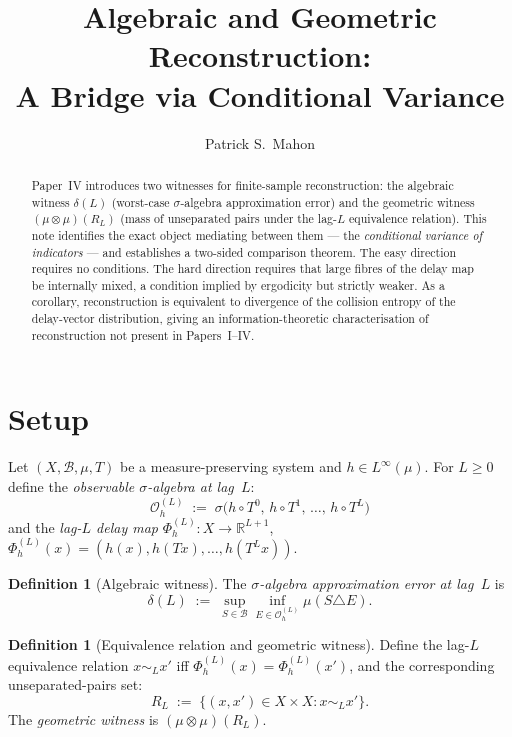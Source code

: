 \documentclass[11pt]{article}
\title{Algebraic and Geometric Reconstruction:\\
\large A Bridge via Conditional Variance}
\author{Patrick S.\ Mahon}
\date{}
\theoremstyle{definition}
\newtheorem{definition}[theorem]{Definition}
\newcommand{\Bcal}{\mathcal{B}}
\newcommand{\OL}{\mathcal{O}_h^{(L)}}
\newcommand{\PhiL}{\Phi_h^{(L)}}
\newcommand{\Lp}[1]{L^{#1}}
\newcommand{\RL}{R_L}
\newcommand{\dL}{\delta(L)}
\begin{document}
\maketitle

\begin{abstract}
Paper~IV introduces two witnesses for finite-sample reconstruction: the
algebraic witness $\delta(L)$ (worst-case $\sigma$-algebra approximation error)
and the geometric witness $(\mu \otimes \mu)(R_L)$ (mass of unseparated pairs
under the lag-$L$ equivalence relation).
This note identifies the exact object mediating between them --- the
\emph{conditional variance of indicators} --- and establishes a two-sided
comparison theorem.
The easy direction requires no conditions.
The hard direction requires that large fibres of the delay map be internally
mixed, a condition implied by ergodicity but strictly weaker.
As a corollary, reconstruction is equivalent to divergence of the collision
entropy of the delay-vector distribution, giving an information-theoretic
characterisation of reconstruction not present in Papers~I--IV.
\end{abstract}

\section{Setup}

Let $(X, \Bcal, \mu, T)$ be a measure-preserving system and $h \in \Lp{\infty}(\mu)$.
For $L \geq 0$ define the \emph{observable $\sigma$-algebra at lag~$L$}:
\[
  \OL \;:=\; \sigma\bigl(h \circ T^0,\, h \circ T^1,\, \ldots,\, h \circ T^L\bigr)
\]
and the \emph{lag-$L$ delay map} $\PhiL : X \to \mathbb{R}^{L+1}$,
$\PhiL(x) = (h(x), h(Tx), \ldots, h(T^L x))$.

\begin{definition}[Algebraic witness]
The \emph{$\sigma$-algebra approximation error at lag~$L$} is
\[
  \dL \;:=\; \sup_{S \in \Bcal} \inf_{E \in \OL} \mu(S \triangle E).
\]
\end{definition}

\begin{definition}[Equivalence relation and geometric witness]
Define the lag-$L$ equivalence relation $x \sim_L x'$ iff
$\PhiL(x) = \PhiL(x')$, and the corresponding unseparated-pairs set:
\[
  \RL \;:=\; \bigl\{(x,x') \in X \times X : x \sim_L x'\bigr\}.
\]
The \emph{geometric witness} is $(\mu \otimes \mu)(\RL)$.
\end{definition}
\end{document}
